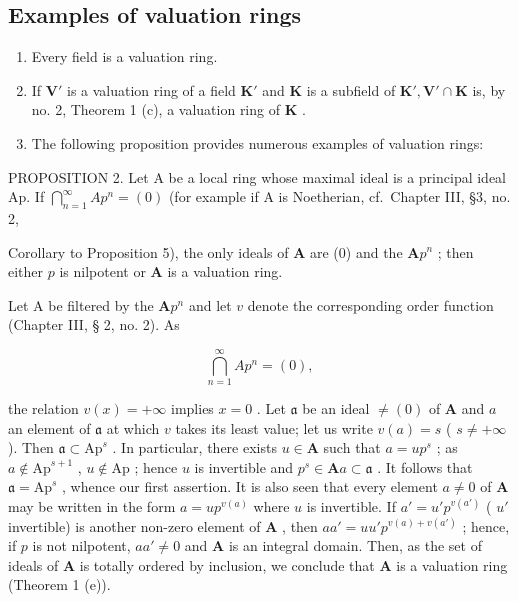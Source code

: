 \subsection{Examples of valuation rings}

\begin{enumerate}
\def\labelenumi{(\arabic{enumi})}
\item
  Every field is a valuation ring.
\item
  If \(\mathbf{V}'\) is a valuation ring of a field \(\mathbf{K}'\) and \(\mathbf{K}\) is a subfield of \(\mathbf{K}', \mathbf{V}' \cap \mathbf{K}\) is, by no. 2, Theorem 1 (c), a valuation ring of \(\mathbf{K}\) .
\item
  The following proposition provides numerous examples of valuation rings:
\end{enumerate}

PROPOSITION 2. Let A be a local ring whose maximal ideal is a principal ideal Ap. If \(\bigcap_{n=1}^{\infty} A p^n = (0)\) (for example if A is Noetherian, cf.~Chapter III, §3, no. 2,

Corollary to Proposition 5), the only ideals of \(\mathbf{A}\) are (0) and the \(\mathbf{A}p^n\) ; then either \(p\) is nilpotent or \(\mathbf{A}\) is a valuation ring.

Let A be filtered by the \(\mathbf{A}p^n\) and let \(v\) denote the corresponding order function (Chapter III, § 2, no. 2). As

\[
\bigcap_ {n = 1} ^ {\infty} A p ^ {n} = (0),
\]

the relation \(v(x) = +\infty\) implies \(x = 0\) . Let \(\mathfrak{a}\) be an ideal \(\neq (0)\) of \(\mathbf{A}\) and \(a\) an element of \(\mathfrak{a}\) at which \(v\) takes its least value; let us write \(v(a) = s\) ( \(s \neq +\infty\) ). Then \(\mathfrak{a} \subset \mathrm{Ap}^s\) . In particular, there exists \(u \in \mathbf{A}\) such that \(a = up^s\) ; as \(a \notin \mathrm{Ap}^{s+1}\) , \(u \notin \mathrm{Ap}\) ; hence \(u\) is invertible and \(p^s \in \mathbf{A}a \subset \mathfrak{a}\) . It follows that \(\mathfrak{a} = \mathrm{Ap}^s\) , whence our first assertion. It is also seen that every element \(a \neq 0\) of \(\mathbf{A}\) may be written in the form \(a = up^{v(a)}\) where \(u\) is invertible. If \(a' = u'p^{v(a')}\) ( \(u'\) invertible) is another non-zero element of \(\mathbf{A}\) , then \(aa' = uu'p^{v(a)+v(a')}\) ; hence, if \(p\) is not nilpotent, \(aa' \neq 0\) and \(\mathbf{A}\) is an integral domain. Then, as the set of ideals of \(\mathbf{A}\) is totally ordered by inclusion, we conclude that \(\mathbf{A}\) is a valuation ring (Theorem 1 (e)).

